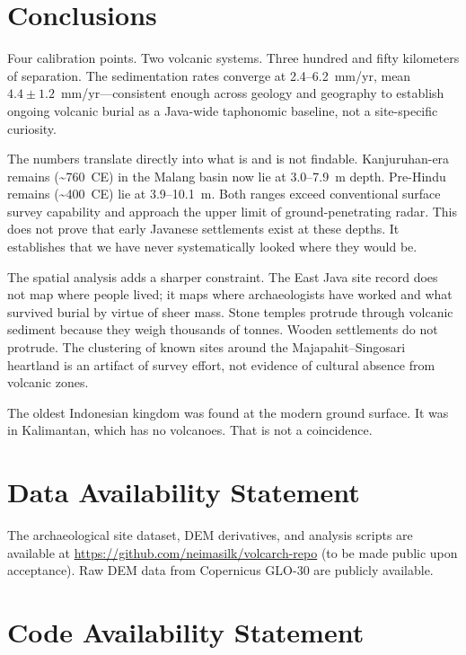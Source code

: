 \documentclass[12pt,a4paper]{article}
\begin{document}
\section{Conclusions}

Four calibration points. Two volcanic systems. Three hundred and fifty kilometers of separation. The sedimentation rates converge at 2.4--6.2~mm/yr, mean $4.4 \pm 1.2$~mm/yr---consistent enough across geology and geography to establish ongoing volcanic burial as a Java-wide taphonomic baseline, not a site-specific curiosity.

The numbers translate directly into what is and is not findable. Kanjuruhan-era remains (\textasciitilde760~CE) in the Malang basin now lie at 3.0--7.9~m depth. Pre-Hindu remains (\textasciitilde400~CE) lie at 3.9--10.1~m. Both ranges exceed conventional surface survey capability and approach the upper limit of ground-penetrating radar. This does not prove that early Javanese settlements exist at these depths. It establishes that we have never systematically looked where they would be.

The spatial analysis adds a sharper constraint. The East Java site record does not map where people lived; it maps where archaeologists have worked and what survived burial by virtue of sheer mass. Stone temples protrude through volcanic sediment because they weigh thousands of tonnes. Wooden settlements do not protrude. The clustering of known sites around the Majapahit--Singosari heartland is an artifact of survey effort, not evidence of cultural absence from volcanic zones.

The oldest Indonesian kingdom was found at the modern ground surface. It was in Kalimantan, which has no volcanoes. That is not a coincidence.

\section*{Data Availability Statement}

The archaeological site dataset, DEM derivatives, and analysis scripts are available at \url{https://github.com/neimasilk/volcarch-repo} (to be made public upon acceptance). Raw DEM data from Copernicus GLO-30 are publicly available.

\section*{Code Availability Statement}
\end{document}
